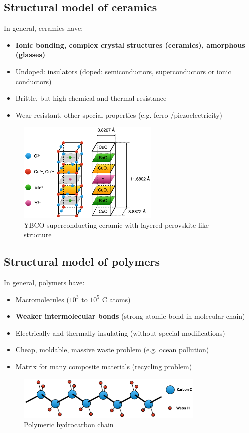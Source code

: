 \documentclass{article}
\begin{document}
\subsection{Structural model of ceramics}
In general, ceramics have:
\begin{itemize}
  \item \textbf{Ionic bonding, complex crystal structures (ceramics), amorphous (glasses)}
  \item Undoped: insulators (doped: semiconductors, superconductors or ionic conductors)
  \item Brittle, but high chemical and thermal resistance
  \item Wear-resistant, other special properties (e.g. ferro-/piezoelectricity)
\end{itemize}

\begin{figure}[ht!]
  \centering
  \includegraphics[width=0.6\textwidth]{media/ceramic_structure.png}
  \caption*{YBCO superconducting ceramic with layered perovskite-like structure}
\end{figure}

\subsection{Structural model of polymers}
In general, polymers have:
\begin{itemize}
  \item Macromolecules ($10^3$ to $10^5$ C atoms)
  \item \textbf{Weaker intermolecular bonds} (strong atomic bond in molecular chain)
  \item Electrically and thermally insulating (without special modifications)
  \item Cheap, moldable, massive waste problem (e.g. ocean pollution)
  \item Matrix for many composite materials (recycling problem)
\end{itemize}
\begin{figure}[ht!]
  \centering
  \includegraphics[width=0.8\textwidth]{media/polymer_structure.png}
  \caption*{Polymeric hydrocarbon chain}
\end{figure}
\end{document}
